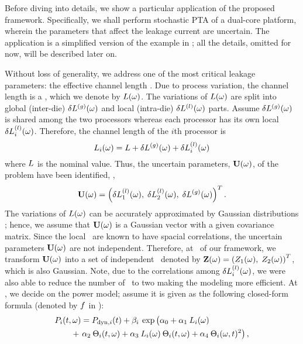 Before diving into details, we show a particular application of the proposed framework. Specifically, we shall perform stochastic PTA of a dual-core platform, wherein the parameters that affect the leakage current are uncertain. The application is a simplified version of the example in ; all the details, omitted for now, will be described later on.



Without loss of generality, we address one of the most critical leakage parameters: the effective channel length \cite{chandra2010, juan2011, juan2012, srivastava2010, shen2009}. Due to process variation, the channel length is a \rv, which we denote by $L(\omega)$. The variations of $L(\omega)$ are split into global (inter-die) ${\delta L^{(g)}}(\omega)$ and local (intra-die) $\delta L^{(l)}(\omega)$ parts. Assume ${\delta L^{(g)}}(\omega)$ is shared among the two processors whereas each processor has its own local \rv\ $\delta L^{(l)}_i(\omega)$. Therefore, the channel length of the $i$th processor is
\begin{equation} \elabel{leakage-partition}
  \Leff_i(\o) = \nLeff + \gLeff(\o) + \lLeff_i(\o)
\end{equation}
where $L$ is the nominal value. Thus, the uncertain parameters, $\mathbf{U}(\omega)$, of the problem have been identified, \ie,
\[
  \mathbf{U}(\omega) = \left(\delta L^{(l)}_1(\omega), \; \delta L^{(l)}_2(\omega), \; {\delta L^{(g)}}(\omega) \right)^T.
\]
The variations of $L(\omega)$ can be accurately approximated by Gaussian distributions \cite{juan2011, juan2012, srivastava2010}; hence, we assume that $\mathbf{U}(\omega)$ is a Gaussian vector with a given covariance matrix. Since the local \rvs\ are known to have spacial correlations, the uncertain parameters $\mathbf{U}(\omega)$ are not independent. Therefore, at \ of our framework, we transform $\mathbf{U}(\omega)$ into a set of independent \rvs\ denoted by $\mathbf{Z}(\omega) = \left(Z_1(\omega), \; Z_2(\omega)\right)^T$, which is also Gaussian. Note, due to the correlations among $\delta L^{(l)}_i(\omega)$, we were also able to reduce the number of \rvs\ to two making the modeling more efficient. At , we decide on the power model; assume it is given as the following closed-form formula (denoted by $f$ in ):
\begin{align*}
  & \P_i(\t, \o) = \P_{\dyn, i}(\t) + \beta_i \: \exp \left(\vphantom{\T^2_i} \alpha_0 + \alpha_1 \: \Leff_i(\o) \right. \\
  & \qquad {} + \left. \alpha_2 \: \T_i(\t, \o) + \alpha_3 \: \Leff_i(\o) \: \T_i(\t, \o) + \alpha_4 \: \T_i(\o, \t)^2 \right),
\end{align*}
